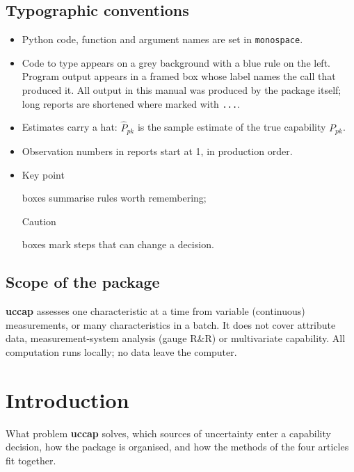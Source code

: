 \documentclass[a4paper,11pt,oneside,openany,parskip=half-,headings=standardclasses,toc=flat,numbers=noenddot]{scrbook}
\newcommand{\code}[1]{\texttt{\begingroup\def\_{\textunderscore\allowbreak}#1\endgroup}}
\newcommand{\pkg}{\textsf{\bfseries uccap}}
\newenvironment{chapterintro}{\begingroup\sffamily\small\color{muted}\noindent\ignorespaces}{\par\endgroup\medskip}
\newcommand{\Ppkhat}{\widehat{P}_{pk}}
\begin{document}
\section*{Typographic conventions}

\begin{itemize}
\item Python code, function and argument names are set in \code{monospace}.
\item Code to type appears on a grey background with a blue rule on the left. Program output appears
  in a framed box whose label names the call that produced it. All output in this manual was produced
  by the package itself; long reports are shortened where marked with \code{...}.
\item Estimates carry a hat: $\Ppkhat$ is the sample estimate of the true capability $P_{pk}$.
\item Observation numbers in reports start at 1, in production order.
\item \colorbox{accentlight}{\strut Key point} boxes summarise rules worth remembering;
  \colorbox{warn!55}{\strut Caution} boxes mark steps that can change a decision.
\end{itemize}

\section*{Scope of the package}
\pkg{} assesses one characteristic at a time from variable (continuous) measurements, or many
characteristics in a batch. It does not cover attribute data, measurement-system analysis
(gauge R\&R) or multivariate capability. All computation runs locally; no data leave the computer.

\tableofcontents

\mainmatter

\chapter{Introduction}\label{ch:intro}

\begin{chapterintro}
What problem \pkg{} solves, which sources of uncertainty enter a capability decision, how the package
is organised, and how the methods of the four articles fit together.
\end{chapterintro}
\end{document}
